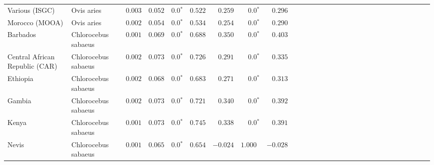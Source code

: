 \begin{center}
\begin{adjustbox}{width = 1\textwidth}
\begin{tabular}{|l|l|r|r|r|r|r|r|r|r|r|r|r|r|r|r|r|r|r|r|r|r|r|r|r|r|r|r|r|}
                 Various (ISGC) &           Ovis aries &           $ 0.003$ &                      $ 0.052$ &                  $\bm{0.0{^*}}$ &                                           $ 0.522$ &                      $ 0.259$ &                  $\bm{0.0{^*}}$ &                                           $ 0.296$ \\
                 Morocco (MOOA) &           Ovis aries &           $ 0.002$ &                      $ 0.054$ &                  $\bm{0.0{^*}}$ &                                           $ 0.534$ &                      $ 0.254$ &                  $\bm{0.0{^*}}$ &                                           $ 0.290$ \\
                       Barbados &  Chlorocebus sabaeus &           $ 0.001$ &                      $ 0.069$ &                  $\bm{0.0{^*}}$ &                                           $ 0.688$ &                      $ 0.350$ &                  $\bm{0.0{^*}}$ &                                           $ 0.403$ \\
 Central African Republic (CAR) &  Chlorocebus sabaeus &           $ 0.002$ &                      $ 0.073$ &                  $\bm{0.0{^*}}$ &                                           $ 0.726$ &                      $ 0.291$ &                  $\bm{0.0{^*}}$ &                                           $ 0.335$ \\
                       Ethiopia &  Chlorocebus sabaeus &           $ 0.002$ &                      $ 0.068$ &                  $\bm{0.0{^*}}$ &                                           $ 0.683$ &                      $ 0.271$ &                  $\bm{0.0{^*}}$ &                                           $ 0.313$ \\
                         Gambia &  Chlorocebus sabaeus &           $ 0.002$ &                      $ 0.073$ &                  $\bm{0.0{^*}}$ &                                           $ 0.721$ &                      $ 0.340$ &                  $\bm{0.0{^*}}$ &                                           $ 0.392$ \\
                          Kenya &  Chlorocebus sabaeus &           $ 0.001$ &                      $ 0.073$ &                  $\bm{0.0{^*}}$ &                                           $ 0.745$ &                      $ 0.338$ &                  $\bm{0.0{^*}}$ &                                           $ 0.391$ \\
                          Nevis &  Chlorocebus sabaeus &           $ 0.001$ &                      $ 0.065$ &                  $\bm{0.0{^*}}$ &                                           $ 0.654$ &                      $-0.024$ &                      $ 1.000~~$ &                                           $-0.028$ \\

\end{tabular}
\end{adjustbox}
\end{center}
